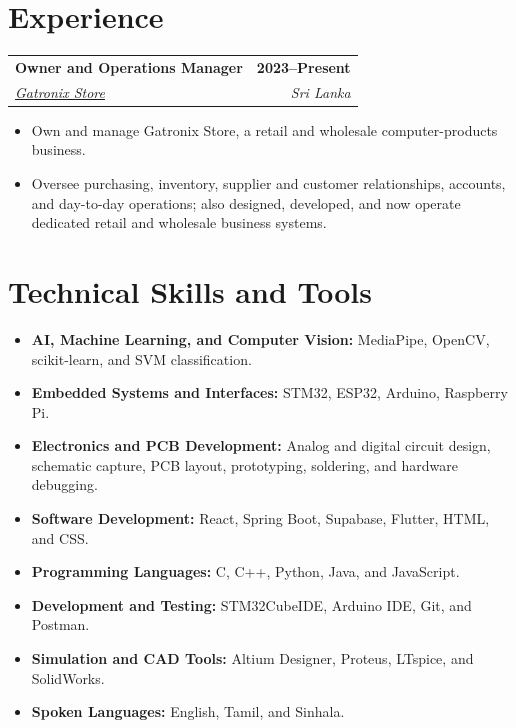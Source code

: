 \documentclass[a4paper,10pt]{article}
\makeatletter
\newcommand{\educationEntry}[4]{%
  \begin{tabularx}{\textwidth}{@{}Xr@{}}
    \textbf{#1} & \textbf{\small #2} \\
    \textit{#3} & \textit{\small #4}
  \end{tabularx}
}
\makeatother
\begin{document}
\vspace{1.1mm}

\section{Experience}

\educationEntry
  {Owner and Operations Manager}
  {2023--Present}
  {\href{https://maps.app.goo.gl/z9wBnqUMZs5da7UM9}{Gatronix Store \faMapMarker}}
  {Sri Lanka}

\begin{itemize}
  \item Own and manage Gatronix Store, a retail and wholesale computer-products business.
  \item Oversee purchasing, inventory, supplier and customer relationships, accounts, and day-to-day operations; also designed, developed, and now operate dedicated retail and wholesale business systems.
\end{itemize}

\section{Technical Skills and Tools}
\begin{itemize}[itemsep=0.8mm,topsep=0.45mm]
  \item \textbf{AI, Machine Learning, and Computer Vision:} MediaPipe, OpenCV, scikit-learn, and SVM classification.
  \item \textbf{Embedded Systems and Interfaces:} STM32, ESP32, Arduino, Raspberry Pi.
  \item \textbf{Electronics and PCB Development:} Analog and digital circuit design, schematic capture, PCB layout, prototyping, soldering, and hardware debugging.
  \item \textbf{Software Development:} React, Spring Boot, Supabase, Flutter, HTML, and CSS.
  \item \textbf{Programming Languages:} C, C++, Python, Java, and JavaScript.
  \item \textbf{Development and Testing:} STM32CubeIDE, Arduino IDE, Git, and Postman.
  \item \textbf{Simulation and CAD Tools:} Altium Designer, Proteus, LTspice, and SolidWorks.
  \item \textbf{Spoken Languages:} English, Tamil, and Sinhala.
\end{itemize}
\end{document}
